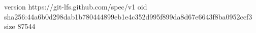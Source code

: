 version https://git-lfs.github.com/spec/v1
oid sha256:44a6b0d298dab1b780444899eb1e4c352d995f899da8d67e6643f8ba0952ccf3
size 87544
